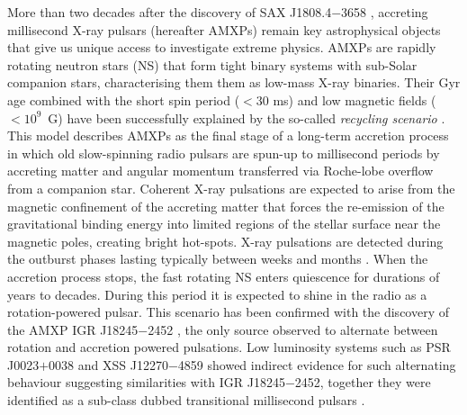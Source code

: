 \documentclass[fleqn,usenatbib]{mnras}
\begin{document}
More than two decades after the discovery of SAX J1808.4$-$3658 \citep{Wijnands:1998vk}, accreting millisecond X-ray pulsars (hereafter AMXPs) remain key astrophysical objects that give us unique access to investigate extreme physics. AMXPs are rapidly rotating neutron stars (NS) that form tight binary systems with sub-Solar companion stars, characterising them them as low-mass X-ray binaries. Their Gyr age combined with the short spin period ($<30$ ms) and low magnetic fields ($<10^9$~G) have been successfully explained by the so-called \textit{recycling scenario} \citep[see e.g.,][]{Alpar:1982wh,Bhattacharya91}. This model describes AMXPs as the final stage of a long-term accretion process in which old slow-spinning radio pulsars are spun-up to millisecond periods by accreting matter and angular momentum transferred via Roche-lobe overflow from a companion star. Coherent X-ray pulsations are expected to arise from the magnetic confinement of the accreting matter that forces the re-emission of the gravitational binding energy into limited regions of the stellar surface near the magnetic poles, creating bright hot-spots.  
X-ray pulsations are detected during the outburst phases lasting typically between weeks and months \citep[see e.g.,][for reviews]{Di-Salvo:2020va,Patruno:2021vs}.
When the accretion process stops, the fast rotating NS enters quiescence for durations of years to decades. During this period it is expected to shine in the radio as a rotation-powered pulsar. This scenario has been confirmed with the discovery of the AMXP IGR J18245$-$2452 \citep{Papitto:2013uf}, the only source observed to alternate between rotation and accretion powered pulsations. Low luminosity systems such as PSR J0023$+$0038 \citep[see e.g.,][]{Stappers:2014wn,Archibald:2015vw} and XSS J12270$-$4859 \citep[see e.g.,][]{Bassa:2014uu,Papitto:2015wo} showed indirect evidence for such alternating behaviour suggesting similarities with IGR J18245$-$2452, together they were identified as a sub-class dubbed transitional millisecond pulsars \citep[see][for a review]{Papitto:2020wl}.
\end{document}
